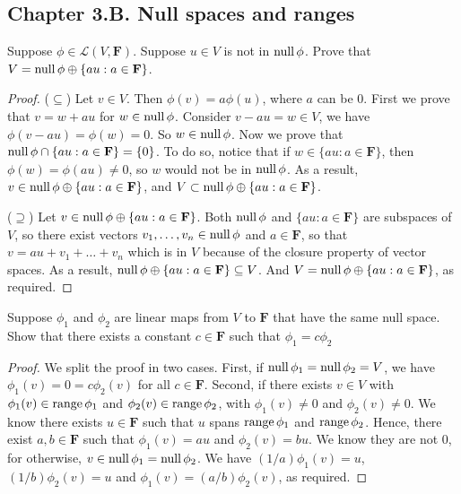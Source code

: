 \subsection*{Chapter 3.B. Null spaces and ranges}


\begin{exercise}{29}
 Suppose $\phi\in\mathcal{L}(V,\mathbf{F})$. Suppose $u\in V$ is not in $\operatorname*{null}\phi$. Prove that $V=\operatorname*{null}\phi \oplus \{au: a\in \mathbf{F}\}$.
\end{exercise}
\begin{proof}
 ($\subseteq$) Let $v\in V$. Then $\phi(v)=a\phi(u)$, where $a$ can be 0. First we prove that $v=w+au$ for $w\in\operatorname*{null}\phi$. Consider $v-au=w\in V$, we have $\phi(v-au)=\phi(w)=0$. So $w\in\operatorname*{null}\phi$. 
 Now we prove that $\operatorname*{null}\phi\cap\{au:a\in\mathbf{F}\}=\{0\}$. To do so, notice that if $w\in\{au:a\in\mathbf{F}\}$, then $\phi(w)=\phi(au)\neq0$, so $w$ would not be in $\operatorname*{null}\phi$.
 As a result, $v\in\operatorname*{null}\phi\oplus\{au:a\in\mathbf{F}\}$, and $V\subset\operatorname*{null}\phi\oplus\{au:a\in\mathbf{F}\}$.
 
 ($\supseteq$) Let $v\in\operatorname*{null}\phi\oplus\{au:a\in\mathbf{F}\}$. Both $\operatorname*{null}\phi$ and $\{au:a\in\mathbf{F}\}$ are subspaces of $V$, so there exist vectors $v_{1},\dots,v_{n}\in\operatorname*{null}\phi$ and $a\in\mathbf{F}$, so that $v=au+v_{1}+\dots+v_{n}$ which is in $V$ because of the closure property of vector spaces. As a result,  $\operatorname*{null}\phi\oplus\{au:a\in\mathbf{F}\}\subseteq V$. And $V=\operatorname*{null}\phi \oplus \{au: a\in \mathbf{F}\}$, as required.
\end{proof}


\begin{exercise}{30}
Suppose $\phi_{1}$ and $\phi_{2}$ are linear maps from $V$ to $\mathbf{F}$ that have the same null space. Show that there exists a constant $c\in\mathbf{F}$ such that $\phi_{1}=c\phi_{2}$
\end{exercise}
\begin{proof}
We split the proof in two cases. First, if $\operatorname*{null}\phi_{1}=\operatorname*{null}\phi_{2}=V$, we have $\phi_{1}(v)=0=c\phi_{2}(v)$ for all $c\in\mathbf{F}$. Second, if there exists $v\in V$ with $\phi_{1}(v)\in\operatorname*{range}\phi_{1}$ and $\phi_{2}(v)\in\operatorname*{range}\phi_{2}$, with $\phi_{1}(v)\neq0$ and $\phi_{2}(v)\neq0$. We know there exists $u\in\mathbf{F}$ such that $u$ spans $\operatorname*{range}\phi_{1}$ and $\operatorname*{range}\phi_{2}$. Hence, there exist $a,b\in\mathbf{F}$ such that $\phi_{1}(v)=au$ and $\phi_{2}(v)=bu$. We know they are not 0, for otherwise, $v\in\operatorname*{null}\phi_{1}=\operatorname*{null}\phi_{2}$. We have $(1/a)\phi_{1}(v)=u$, $(1/b)\phi_{2}(v)=u$ and $\phi_{1}(v)=(a/b)\phi_{2}(v)$, as required.
\end{proof}
